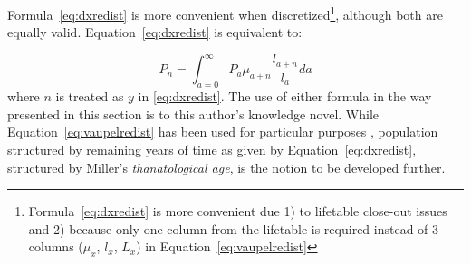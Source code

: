 Formula~\eqref{eq:dxredist} is more convenient when 
discretized\footnote{Formula~\eqref{eq:dxredist} is more convenient due 1) to lifetable 
close-out issues and 2) because only one column from the lifetable is required instead 
of 3 columns ($\mu_x$, $l_x$, $L_x$) in
Equation~\eqref{eq:vaupelredist} }, although both are equally valid.
Equation~\ref{eq:dxredist} is equivalent to:

\begin{equation}
P_n = \int _{a=0} ^\infty P_a \mu_{a+n} \frac{l_{a+n}}{l_a} da
\end{equation}
where $n$ is treated as $y$ in \ref{eq:dxredist}.
The use of either formula in the way presented in this section is to this
author's knowledge novel. While Equation~\eqref{eq:vaupelredist} has
been used for particular purposes \citep{miller2001increasing}, population
structured by remaining years of time as given by Equation~\eqref{eq:dxredist}, structured
by Miller's \textit{thanatological age}, is the notion
to be developed further.

